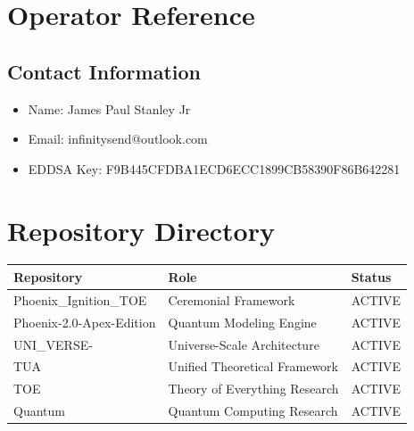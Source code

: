 \documentclass[12pt,twoside]{book}
\begin{document}

\appendix

\chapter{Operator Reference}

\section{Contact Information}

\begin{itemize}
  \item Name: James Paul Stanley Jr
  \item Email: infinitysend@outlook.com
  \item EDDSA Key: F9B445CFDBA1ECD6ECC1899CB58390F86B642281
\end{itemize}

\chapter{Repository Directory}

\begin{tabular}{|l|l|l|}
\hline
\textbf{Repository} & \textbf{Role} & \textbf{Status} \\
\hline
Phoenix\_Ignition\_TOE & Ceremonial Framework & ACTIVE \\
Phoenix-2.0-Apex-Edition & Quantum Modeling Engine & ACTIVE \\
UNI\_VERSE- & Universe-Scale Architecture & ACTIVE \\
TUA & Unified Theoretical Framework & ACTIVE \\
TOE & Theory of Everything Research & ACTIVE \\
Quantum & Quantum Computing Research & ACTIVE \\
\hline
\end{tabular}
\end{document}
